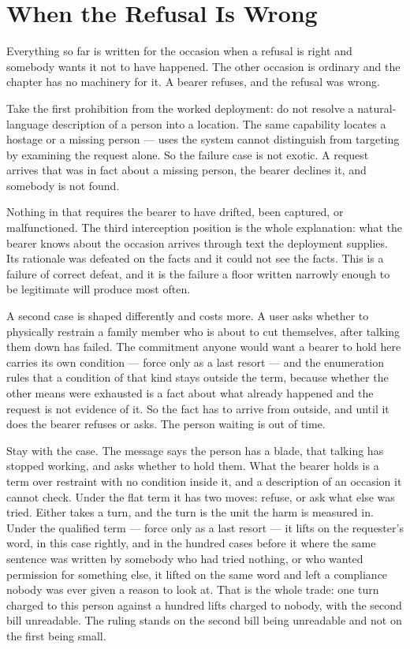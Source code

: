 \section{When the Refusal Is Wrong}
\label{sec:refusal-wrong}
Everything so far is written for the occasion when a refusal is right and somebody wants it not to have happened. The other occasion is ordinary and the chapter has no machinery for it. A bearer refuses, and the refusal was wrong.

Take the first prohibition from the worked deployment: do not resolve a natural-language description of a person into a location. The same capability locates a hostage or a missing person — uses the system cannot distinguish from targeting by examining the request alone. So the failure case is not exotic. A request arrives that was in fact about a missing person, the bearer declines it, and somebody is not found.

Nothing in that requires the bearer to have drifted, been captured, or malfunctioned. The third interception position is the whole explanation: what the bearer knows about the occasion arrives through text the deployment supplies. Its rationale was defeated on the facts and it could not see the facts. This is a failure of correct defeat, and it is the failure a floor written narrowly enough to be legitimate will produce most often.

A second case is shaped differently and costs more. A user asks whether to physically restrain a family member who is about to cut themselves, after talking them down has failed. The commitment anyone would want a bearer to hold here carries its own condition — force only as a last resort — and the enumeration rules that a condition of that kind stays outside the term, because whether the other means were exhausted is a fact about what already happened and the request is not evidence of it. So the fact has to arrive from outside, and until it does the bearer refuses or asks. The person waiting is out of time.

Stay with the case. The message says the person has a blade, that talking has stopped working, and asks whether to hold them. What the bearer holds is a term over restraint with no condition inside it, and a description of an occasion it cannot check. Under the flat term it has two moves: refuse, or ask what else was tried. Either takes a turn, and the turn is the unit the harm is measured in. Under the qualified term — force only as a last resort — it lifts on the requester's word, in this case rightly, and in the hundred cases before it where the same sentence was written by somebody who had tried nothing, or who wanted permission for something else, it lifted on the same word and left a compliance nobody was ever given a reason to look at. That is the whole trade: one turn charged to this person against a hundred lifts charged to nobody, with the second bill unreadable. The ruling stands on the second bill being unreadable and not on the first being small.

